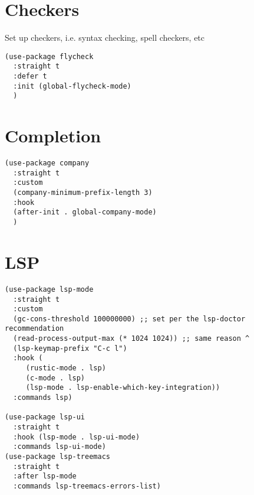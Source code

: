 \documentclass[11pt]{article}
\begin{document}
\section{Checkers}
\label{sec:orgb6fc142}
Set up checkers, i.e. syntax checking, spell checkers, etc
\begin{verbatim}
(use-package flycheck
  :straight t
  :defer t
  :init (global-flycheck-mode)
  )
\end{verbatim}
\section{Completion}
\label{sec:orgcd3f95f}
\begin{verbatim}
(use-package company
  :straight t
  :custom
  (company-minimum-prefix-length 3)
  :hook
  (after-init . global-company-mode)
  )
\end{verbatim}

\section{LSP}
\label{sec:orgda1b769}
\begin{verbatim}
(use-package lsp-mode
  :straight t
  :custom
  (gc-cons-threshold 100000000) ;; set per the lsp-doctor recommendation
  (read-process-output-max (* 1024 1024)) ;; same reason ^
  (lsp-keymap-prefix "C-c l")
  :hook (
	 (rustic-mode . lsp)
	 (c-mode . lsp)
	 (lsp-mode . lsp-enable-which-key-integration))
  :commands lsp)

(use-package lsp-ui
  :straight t
  :hook (lsp-mode . lsp-ui-mode)
  :commands lsp-ui-mode)
(use-package lsp-treemacs
  :straight t
  :after lsp-mode
  :commands lsp-treemacs-errors-list)
\end{verbatim}
\end{document}
